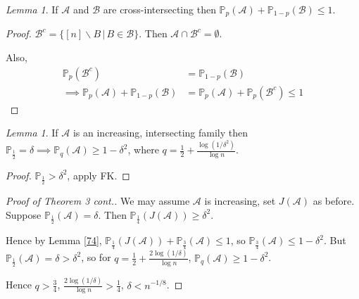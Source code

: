 \documentclass[a4paper]{article}
\theoremstyle{definition}
\theoremstyle{remark}
\theoremstyle{default}
\newtheorem{lemma}[theorem]{Lemma}
\begin{document}
\begin{lemma}
	If $\mathcal{A}$ and $\mathcal{B}$ are cross-intersecting then
	$\mathbb{P}_p(\mathcal{A}) + \mathbb{P}_{1-p}(\mathcal{B}) \leq 1$.
\end{lemma}
\begin{proof}
	$\mathcal{B}^c = \{[n] \backslash B \,|\, B \in \mathcal{B} \}$.
	Then $\mathcal{A} \cap \mathcal{B}^c = \emptyset$.
	
	Also,
	\begin{align*}
		\mathbb{P}_p(\mathcal{B}^c) &= \mathbb{P}_{1-p}(\mathcal{B}) \\
		\implies \mathbb{P}_p(\mathcal{A}) + \mathbb{P}_{1-p}(\mathcal{B}) 
		&= \mathbb{P}_p(\mathcal{A}) + \mathbb{P}_p(\mathcal{B}^c) \leq 1
	\end{align*}
\end{proof}

\begin{lemma}
	If $\mathcal{A}$ is an increasing, intersecting family then
	$\mathbb{P}_{\frac{1}{2}} = \delta \implies \mathbb{P}_q(\mathcal{A}) \geq 1-\delta^2$,
	where $q=\frac{1}{2} + \frac{\log(1/\delta^2)}{\log n}$.
\end{lemma}
\begin{proof}
	$\mathbb{P}_\frac{1}{2} > \delta^2$, apply FK.
\end{proof}

\begin{proof}[Proof of Theorem 3 cont.]
	We may assume $\mathcal{A}$ is increasing,
	set $J(\mathcal{A})$ as before.
	Suppose $\mathbb{P}_\frac{1}{2}(\mathcal{A}) = \delta$.
	Then $\mathbb{P}_\frac{1}{4}(J(\mathcal{A})) \geq \delta^2$.
	
	Hence by Lemma \ref{74},
	$\mathbb{P}_\frac{1}{4}(J(\mathcal{A})) + \mathbb{P}_\frac{3}{4}(\mathcal{A}) \leq 1$,
	so $\mathbb{P}_\frac{3}{4}(\mathcal{A}) \leq 1-\delta^2$.
	But $\mathbb{P}_\frac{1}{2}(\mathcal{A}) = \delta > \delta^2$,
	so for $q=\frac{1}{2} + \frac{2\log(1/\delta)}{\log n}$,
	$\mathbb{P}_q(\mathcal{A}) \geq 1-\delta^2$.
	
	Hence $q > \frac{3}{4}$,
	$\frac{2\log(1/\delta)}{\log n} > \frac{1}{4}$,
	$\delta < n^{-1/8}$.
\end{proof}
\end{document}
